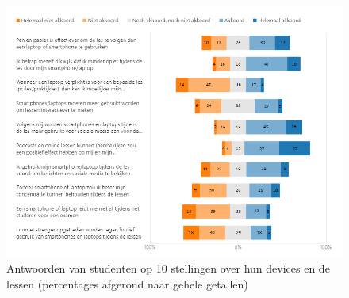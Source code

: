 \begin{figure}
	\includegraphics[width=\textwidth]
	{img/stellingen.png}
	\caption{Antwoorden van studenten op 10 stellingen over hun devices en de lessen (percentages afgerond naar gehele getallen)}
	\label{fig:stellingen}
\end{figure}


